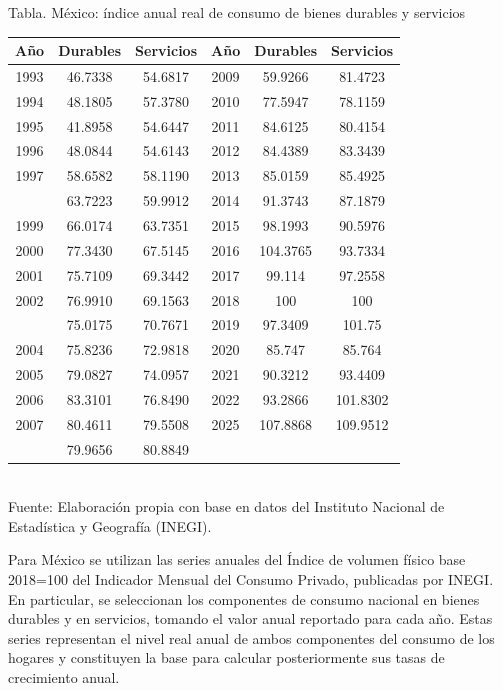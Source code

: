 \documentclass{article}\usepackage[]{graphicx}\usepackage[]{xcolor}
\begin{document}
\begin{center}
Tabla. México: índice anual real de consumo de bienes durables y servicios
\end{center}
\begin{center}

\begin{tabular}{cccccc}
\toprule
Año & Durables & Servicios & Año & Durables & Servicios\\
\midrule
1993 & 46.7338 & 54.6817 & 2009 & 59.9266 & 81.4723\\
1994 & 48.1805 & 57.3780 & 2010 & 77.5947 & 78.1159\\
1995 & 41.8958 & 54.6447 & 2011 & 84.6125 & 80.4154\\
1996 & 48.0844 & 54.6143 & 2012 & 84.4389 & 83.3439\\
1997 & 58.6582 & 58.1190 & 2013 & 85.0159 & 85.4925\\
\addlinespace
1998 & 63.7223 & 59.9912 & 2014 & 91.3743 & 87.1879\\
1999 & 66.0174 & 63.7351 & 2015 & 98.1993 & 90.5976\\
2000 & 77.3430 & 67.5145 & 2016 & 104.3765 & 93.7334\\
2001 & 75.7109 & 69.3442 & 2017 & 99.114 & 97.2558\\
2002 & 76.9910 & 69.1563 & 2018 & 100 & 100\\
\addlinespace
2003 & 75.0175 & 70.7671 & 2019 & 97.3409 & 101.75\\
2004 & 75.8236 & 72.9818 & 2020 & 85.747 & 85.764\\
2005 & 79.0827 & 74.0957 & 2021 & 90.3212 & 93.4409\\
2006 & 83.3101 & 76.8490 & 2022 & 93.2866 & 101.8302\\
2007 & 80.4611 & 79.5508 & 2025 & 107.8868 & 109.9512\\
\addlinespace
2008 & 79.9656 & 80.8849 &  &  & \\
\bottomrule
\end{tabular}
\\[0.3em]
{\footnotesize Fuente: Elaboración propia con base en datos del Instituto Nacional de Estadística y Geografía (INEGI).}
\end{center}


Para México se utilizan las series anuales del Índice de volumen físico base 2018=100 del Indicador Mensual del Consumo Privado, publicadas por INEGI. En particular, se seleccionan los componentes de consumo nacional en bienes durables y en servicios, tomando el valor anual reportado para cada año. Estas series representan el nivel real anual de ambos componentes del consumo de los hogares y constituyen la base para calcular posteriormente sus tasas de crecimiento anual.
\end{document}
